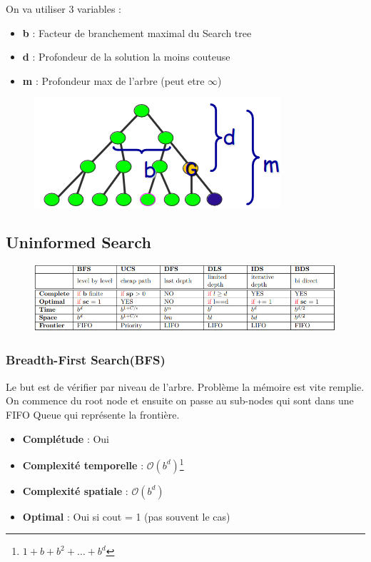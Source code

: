 			On va utiliser 3 variables :
			\begin{itemize}
				\item \textbf{b} : Facteur de branchement maximal du Search tree
				\item \textbf{d} : Profondeur de la solution la moins couteuse
				\item \textbf{m} : Profondeur max de l'arbre (peut etre $\infty$)
			\end{itemize}
			
			\begin{figure}[H]
				\centering
				\includegraphics[width=.5\textwidth]{img/BDM.png}
			\end{figure}
	\subsection{Uninformed Search}
		\begin{figure}[htp]
			\centering
			\includegraphics[width=\textwidth]{img/UninformedSearch.png}
		\end{figure}
		\subsubsection{Breadth-First Search(BFS)}
			Le but est de vérifier par niveau de l'arbre. Problème la mémoire est vite remplie. On commence du root node et ensuite on passe au sub-nodes qui sont dans une FIFO Queue qui représente la frontière.
			
			\begin{itemize}
				\item \textbf{Complétude} : Oui
				\item \textbf{Complexité temporelle} : $\mathcal{O}(b^d)$\footnote{$1+b+b^2 + \dots + b^d$}
				\item \textbf{Complexité spatiale} : $\mathcal{O}(b^d)$
				\item \textbf{Optimal} : Oui si cout = 1 (pas souvent le cas)
			\end{itemize}
			
